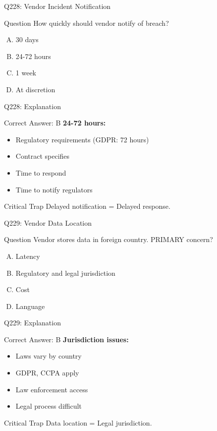 \documentclass{beamer}
\begin{document}
	\begin{frame}{Q228: Vendor Incident Notification}
		\begin{block}{Question}
			How quickly should vendor notify of breach?
		\end{block}
		\begin{enumerate}[(A)]
			\item 30 days
			\item 24-72 hours
			\item 1 week
			\item At discretion
		\end{enumerate}
	\end{frame}
	
	\begin{frame}{Q228: Explanation}
		\begin{block}{Correct Answer: B}
			\textbf{24-72 hours:}
			\begin{itemize}
				\item Regulatory requirements (GDPR: 72 hours)
				\item Contract specifies
				\item Time to respond
				\item Time to notify regulators
			\end{itemize}
		\end{block}
		\begin{alertblock}{Critical Trap}
			Delayed notification = Delayed response.
		\end{alertblock}
	\end{frame}
	
	\begin{frame}{Q229: Vendor Data Location}
		\begin{block}{Question}
			Vendor stores data in foreign country. PRIMARY concern?
		\end{block}
		\begin{enumerate}[(A)]
			\item Latency
			\item Regulatory and legal jurisdiction
			\item Cost
			\item Language
		\end{enumerate}
	\end{frame}
	
	\begin{frame}{Q229: Explanation}
		\begin{block}{Correct Answer: B}
			\textbf{Jurisdiction issues:}
			\begin{itemize}
				\item Laws vary by country
				\item GDPR, CCPA apply
				\item Law enforcement access
				\item Legal process difficult
			\end{itemize}
		\end{block}
		\begin{alertblock}{Critical Trap}
			Data location = Legal jurisdiction.
		\end{alertblock}
	\end{frame}
	
\end{document}
